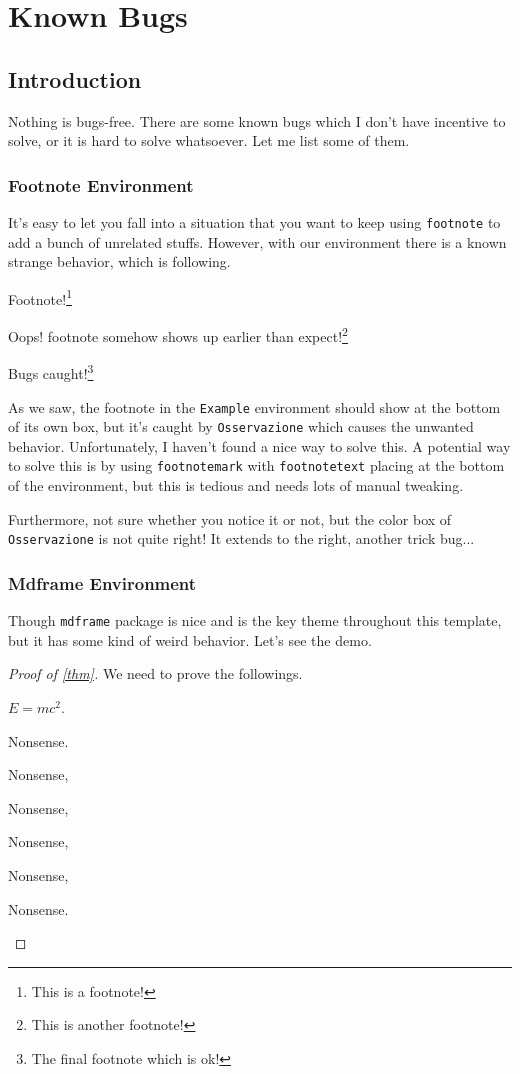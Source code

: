 \chapter{Known Bugs}

\section{Introduction}
Nothing is bugs-free. There are some known bugs which I don't have incentive to solve, or it is hard to solve whatsoever. Let me list some of them.

\subsection{Footnote Environment}
It's easy to let you fall into a situation that you want to keep using \texttt{footnote} to add a bunch of unrelated stuffs. However, with our environment there is a known strange behavior, which is following.
\begin{es}
	Footnote!\footnote{This is a footnote!}
	\begin{osservazione}
		Oops! footnote somehow shows up earlier than expect!\footnote{This is another footnote!}
	\end{osservazione}

	Bugs caught!\footnote{The final footnote which is ok!}
\end{es}

As we saw, the footnote in the \texttt{Example} environment should show at the bottom of its own box, but it's caught by \texttt{Osservazione} which causes the unwanted behavior. Unfortunately, I haven't found a nice way to solve this. A potential way to solve this is by using \texttt{footnotemark} with \texttt{footnotetext} placing at the bottom of the environment, but this is tedious and needs lots of manual tweaking.

Furthermore, not sure whether you notice it or not, but the color box of \texttt{Osservazione} is not quite right! It extends to the right, another trick bug...

\subsection{Mdframe Environment}
Though \texttt{mdframe} package is nice and is the key theme throughout this template, but it has some kind of weird behavior. Let's see the demo.
\begin{proof}[Proof of \autoref{thm}]
	We need to prove the followings.
	\begin{affermazione}
		\(E = mc^{2} \).
	\end{affermazione}
	\begin{spiegaz}

		Nonsense.

		Nonsense,

		Nonsense,

		Nonsense,

		Nonsense,

		Nonsense.
	\end{spiegaz}

\end{proof}

